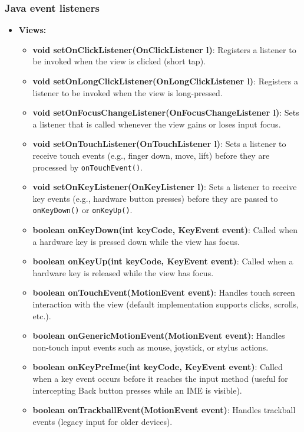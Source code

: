\documentclass{report}
\begin{document}
    \subsubsection{Java event listeners}
    \begin{itemize}
        \item \textbf{Views:}
            \begin{itemize}
                \item \textbf{void setOnClickListener(OnClickListener l)}: Registers a listener to be invoked when the view is clicked (short tap).
                \item \textbf{void setOnLongClickListener(OnLongClickListener l)}: Registers a listener to be invoked when the view is long-pressed.
                \item \textbf{void setOnFocusChangeListener(OnFocusChangeListener l)}: Sets a listener that is called whenever the view gains or loses input focus.
                \item \textbf{void setOnTouchListener(OnTouchListener l)}: Sets a listener to receive touch events (e.g., finger down, move, lift) before they are processed by \texttt{onTouchEvent()}.
                \item \textbf{void setOnKeyListener(OnKeyListener l)}: Sets a listener to receive key events (e.g., hardware button presses) before they are passed to \texttt{onKeyDown()} or \texttt{onKeyUp()}.
                \item \textbf{boolean onKeyDown(int keyCode, KeyEvent event)}: Called when a hardware key is pressed down while the view has focus.
                \item \textbf{boolean onKeyUp(int keyCode, KeyEvent event)}: Called when a hardware key is released while the view has focus.
                \item \textbf{boolean onTouchEvent(MotionEvent event)}: Handles touch screen interaction with the view (default implementation supports clicks, scrolls, etc.).
                \item \textbf{boolean onGenericMotionEvent(MotionEvent event)}: Handles non-touch input events such as mouse, joystick, or stylus actions.
                \item \textbf{boolean onKeyPreIme(int keyCode, KeyEvent event)}: Called when a key event occurs before it reaches the input method (useful for intercepting Back button presses while an IME is visible).
                \item \textbf{boolean onTrackballEvent(MotionEvent event)}: Handles trackball events (legacy input for older devices).

\end{itemize}
\end{itemize}
\end{document}
